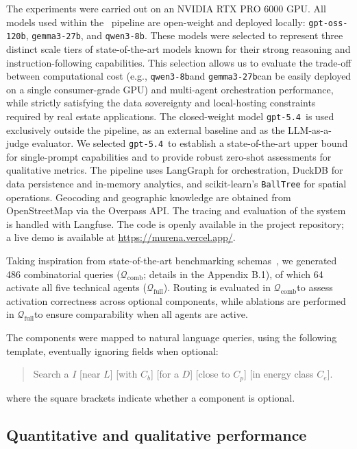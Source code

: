 \documentclass[runningheads,orivec]{llncs}
\newcommand{\demo}{\url{https://murena.vercel.app/}}
\newcommand{\gptoss}{\texttt{gpt-oss-120b}}
\newcommand{\gemma}{\texttt{gemma3-27b}}
\newcommand{\qwen}{\texttt{qwen3-8b}}
\newcommand{\gptfive}{\texttt{gpt-5.4}}
\newcommand{\combqueries}{$\mathcal{Q}_\text{comb}$}
\newcommand{\completequeries}{$\mathcal{Q}_\text{full}$}
\begin{document}
The experiments were carried out on an NVIDIA RTX PRO 6000 GPU.
All models used within the \methodACR\ pipeline are open-weight and deployed locally: \gptoss, \gemma, and \qwen.
These models were selected to represent three distinct scale tiers of state-of-the-art models known for their strong reasoning and instruction-following capabilities. This selection allows us to evaluate the trade-off between computational cost (e.g., \qwen and \gemma can be easily deployed on a single consumer-grade GPU) and multi-agent orchestration performance, while strictly satisfying the data sovereignty and local-hosting constraints required by real estate applications.
The closed-weight model \gptfive\ is used exclusively outside the pipeline, as an external baseline and as the LLM-as-a-judge evaluator.
We selected \gptfive\ to establish a state-of-the-art upper bound for single-prompt capabilities and to provide robust zero-shot assessments for qualitative metrics. 
The pipeline uses LangGraph for orchestration, DuckDB for data persistence and in-memory analytics, and scikit-learn’s \texttt{BallTree} for spatial operations. Geocoding and geographic knowledge are obtained from OpenStreetMap via the Overpass API. The tracing and evaluation of the system is handled with Langfuse. The code is openly available in the project repository; a live demo is available at \demo.

Taking inspiration from state-of-the-art benchmarking schemas~\cite{papicchio2023qatch}, we generated 486 combinatorial queries (\combqueries; details in the Appendix B.1), of which 64 activate all five technical agents (\completequeries). Routing is evaluated in \combqueries to assess activation correctness across optional components, while ablations are performed in \completequeries to ensure comparability when all agents are active.



The components were mapped to natural language queries, using the following template, eventually ignoring fields when optional:
\begin{quote}
    Search a $I$ [near $L$] [with $C_b$] [for a $D$] [close to $C_p$] [in energy class $C_e$].
\end{quote}
where the square brackets indicate whether a component is optional.




\subsection{Quantitative and qualitative performance}
\label{subsec:metrics}
\end{document}
